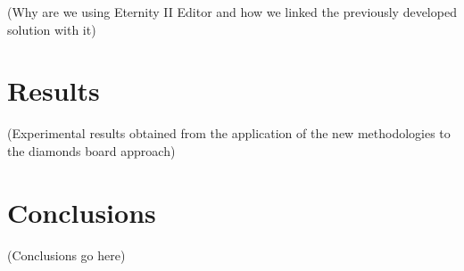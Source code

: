\documentclass{llncs}
\begin{document}
(Why are we using Eternity II Editor and how we linked the previously developed solution with it)

\section{Results}\label{sec:results}

(Experimental results obtained from the application of the new methodologies to the diamonds board approach)

\section{Conclusions}\label{sec:conclusions}

(Conclusions go here)
%
%


\end{document}
